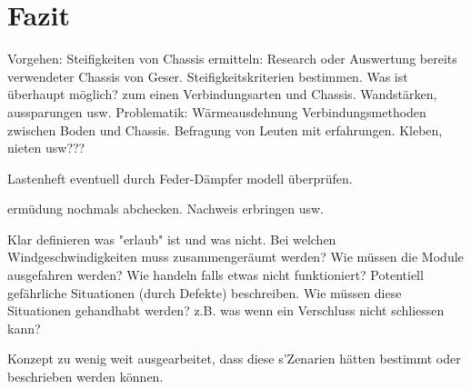 
\section{Fazit}
\label{Fazit}

Vorgehen:
Steifigkeiten von Chassis ermitteln: Research oder Auswertung bereits verwendeter Chassis von Geser.
Steifigkeitskriterien bestimmen.
Was ist überhaupt möglich? zum einen Verbindungsarten und Chassis. Wandstärken, aussparungen usw.
Problematik: Wärmeausdehnung
Verbindungsmethoden zwischen Boden und Chassis. Befragung von Leuten mit erfahrungen. Kleben, nieten usw???

Lastenheft eventuell durch Feder-Dämpfer modell überprüfen.

ermüdung nochmals abchecken. Nachweis erbringen usw.

Klar definieren was "erlaub" ist und was nicht. Bei welchen Windgeschwindigkeiten muss zusammengeräumt werden? Wie müssen die Module ausgefahren werden? Wie handeln falls etwas nicht funktioniert? Potentiell gefährliche Situationen (durch Defekte) beschreiben. Wie müssen diese Situationen gehandhabt werden? z.B. was wenn ein Verschluss nicht schliessen kann?

Konzept zu wenig weit ausgearbeitet, dass diese s'Zenarien hätten bestimmt oder beschrieben werden können.
